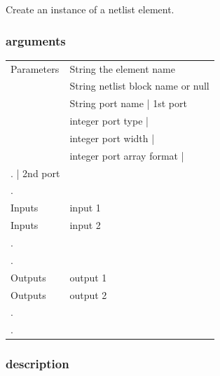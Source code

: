 \documentclass[10pt,a4paper,twoside,fleqn]{book}
\begin{document}
                Create an instance of a netlist element.
                
            \subsubsection{arguments}
            
                \begin{tabular}{| l | l |}
                \hline
                Parameters  & String  the element name               \\
                            & String  netlist block name or null     \\
                            & String    port name         | 1st port \\
                            & integer   port type         |          \\
                            & integer   port width        |          \\
                            & integer   port array format |          \\
                            .                             | 2nd port \\
                            .                                        \\
                \hline
                Inputs      & input 1                                \\
                Inputs      & input 2                                \\
                .                                                    \\
                .                                                    \\
                \hline
                Outputs     & output 1                               \\
                Outputs     & output 2                               \\
                .                                                    \\
                .                                                    \\
                \hline
                \end{tabular}

            \subsubsection{description}
\end{document}

